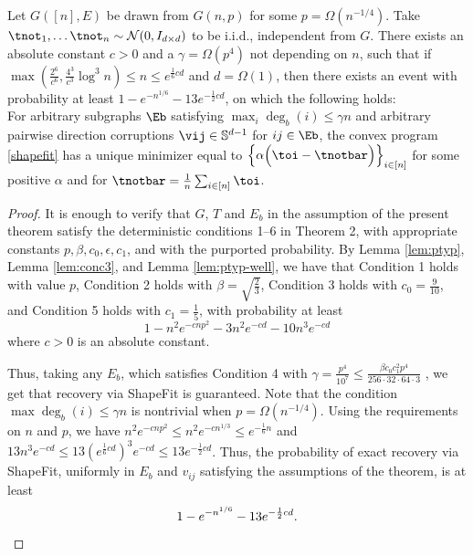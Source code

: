 \begin{theorem} 
Let $G([n],E)$ be drawn from $G(n,p)$ for some $p = \Omega(n^{-1/4})$. Take $ \tnot_1, \ldots \tnot_n \sim \mathcal{N}(0, I_{d \times d})$ to be i.i.d., independent from $G$. There exists an absolute constant $c>0$ and a $\gamma = \Omega(p^4)$ not depending on $n$, such that if $\max(\frac{2^6}{c^6}, \frac{4^3}{c^3} \log^3 n) \leq  n \leq e^{\frac{1}{6}c d}$ and $d = \Omega(1)$, then there exists an event with probability at least  $1- e^{-n^{1/6}} - 13 e^{-\frac{1}{2}c d}$, on which the following holds:\\[1em]
For arbitrary  subgraphs $\Eb$ satisfying $\max_i \deg_b(i) \leq \gamma n$ and arbitrary pairwise direction corruptions  $\vij \in \mathbb{S}^{d-1}$ for $ij \in \Eb$,  the convex program \eqref{shapefit} has a unique minimizer equal to $\left \{\alpha \Bigl(\toi - \tnotbar \Bigr)\right\}_{i \in [n]}$ for some positive $\alpha$ and for $\tnotbar = \frac{1}{n}\sum_{i\in [n]} \toi$. 
\end{theorem}
\begin{proof}
It is enough to verify that $G$, $T$ and $E_b$ in the assumption of the present theorem satisfy the deterministic conditions 1--6 in Theorem 2, with appropriate constants $p, \beta, c_0, \epsilon, c_1$, and with the purported probability. By Lemma \ref{lem:ptyp}, Lemma \ref{lem:conc3}, and Lemma \ref{lem:ptyp-well}, we have that Condition 1 holds with value $p$, Condition 2 holds with $\beta = \sqrt{\frac{2}{3}}$, Condition 3 holds with $c_0 = \frac{9}{10}$, and Condition 5 holds with $c_1 = \frac{1}{5}$, with probability at least
\[
1-n^2 e^{-cnp^2} - 3n^2 e^{-cd} - 10n^3 e^{-cd}
\]
where $c>0$ is an absolute constant.

Thus, taking any $E_b$, which satisfies Condition 4 with $\gamma = \frac{p^4}{10^7} \leq \frac{\beta c_0 c_1^2 p^4}{256\cdot 32\cdot 64 \cdot 3}$ , we get that recovery via ShapeFit is guaranteed. Note that the condition $\max \deg_b(i) \leq \gamma n$ is nontrivial when $p = \Omega(n^{-1/4})$.  Using the requirements on $n$ and $p$, we have $n^2 e^{-cnp^2} \leq n^2 e^{-cn^{1/3}} \leq e^{-\frac{1}{6}n}$ and $13n^3 e^{-cd} \leq 13(e^{\frac{1}{6}cd})^3 e^{-cd} \leq 13 e^{-\frac{1}{2}cd}$. Thus, the probability of exact recovery via ShapeFit, uniformly in $E_b$ and $v_{ij}$ satisfying the assumptions of the theorem, is at least
\[
1- e^{-n^{1/6}} - 13 e^{-\frac{1}{2}c d}. \qedhere
\]



\end{proof}
